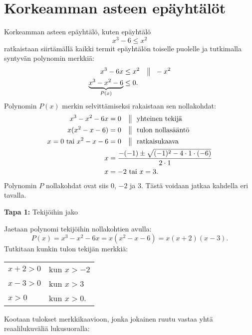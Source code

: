 \chapter{Korkeamman asteen epäyhtälöt}

Korkeamman asteen epäyhtälö, kuten epäyhtälö
$$x^3 -6 \leq x^2 $$
ratkaistaan siirtämällä kaikki termit epäyhtälön toiselle puolelle ja tutkimalla
syntyvän polynomin merkkiä:
\begin{align*}
x^3 -6x &\leq x^2 \quad \big\| \ \ -x^2 \\
\underbrace{x^3-x^2 -6}_{P(x)} &\leq 0.
\end{align*}
Polynomin $P(x)$ merkin selvittämiseksi rakaistaan sen nollakohdat:
\begin{align*}
x^3 - x^2-6x &= 0 \quad \ppalkki \ \ \text{yhteinen tekijä} \\
x(x^2 -x -6) &= 0 \quad \ppalkki \ \ \text{tulon nollasääntö} \\
x = 0 \textrm{ tai } x^2 -x -6 &= 0 \quad\ppalkki \ \ \text{ratkaisukaava} \\
x &=\frac{-(-1) \pm \sqrt{(-1)^2-4\cdot 1 \cdot (-6)}}{2\cdot 1} \\
x &= -2 \textrm{ tai } x = 3.
\end{align*}
Polynomin $P$ nollakohdat ovat siis $0$, $-2$ ja $3$. Tästä voidaan jatkaa kahdella eri tavalla.

\textbf{Tapa 1:} Tekijöihin jako

Jaetaan polynomi tekijöihin nollakohtien avulla:
$$P(x) = x^3 - x^2-6x = x(x^2-x-6) = x(x+2)(x-3).$$
Tutkitaan kunkin tulon tekijän merkkiä:\\
\quad \begin{tabular}{ll}
$x+2>0$ & kun $x > -2$\\
$x-3>0$ & kun $x > 3$\\
$x>0$ & kun $x > 0$.
\end{tabular}

Kootaan tulokset merkkikaavioon, jonka jokainen ruutu vastaa
yhtä reaalilukuväliä lukusuoralla:

\begin{center}
\begin{merkkikaavio}{3}

	\merkkikaavioMerkki{$-$}
	\merkkikaavioMerkki{$+$}
	\merkkikaavioMerkki{$+$}
	\merkkikaavioMerkki{$+$}

\merkkikaavioUusirivi
	\merkkikaavioMerkki{$-$}
	\merkkikaavioMerkki{$-$}
	\merkkikaavioMerkki{$-$}
	\merkkikaavioMerkki{$+$}

\merkkikaavioUusirivi
	\merkkikaavioMerkki{$-$}
	\merkkikaavioMerkki{$-$}
	\merkkikaavioMerkki{$+$}
	\merkkikaavioMerkki{$+$}

\merkkikaavioUusiriviKaksoisviiva
	\merkkikaavioMerkki{$-$}
	\merkkikaavioMerkki{$+$}
	\merkkikaavioMerkki{$-$}
	\merkkikaavioMerkki{$+$}
\end{merkkikaavio}
\end{center}


